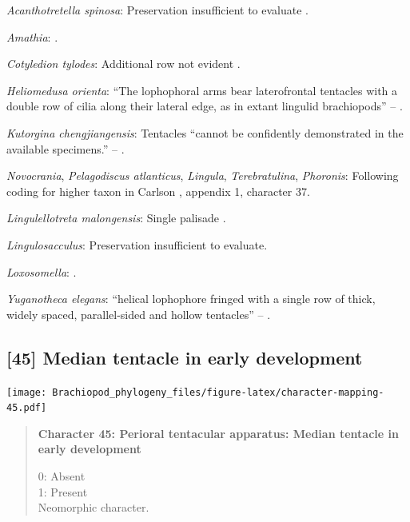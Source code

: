 \documentclass[openany]{book}
\begin{document}
\hypertarget{Acanthotretella_spinosa-coding-44}{}
\emph{Acanthotretella spinosa}: Preservation insufficient to evaluate
\citep{Holmer2006Aspinose}.

\hypertarget{Amathia-coding-44}{}
\emph{Amathia}: \citep{Temereva2016Thenervous}.

\hypertarget{Cotyledion_tylodes-coding-44}{}
\emph{Cotyledion tylodes}: Additional row not evident \citep{Zhang2013}.

\hypertarget{Heliomedusa_orienta-coding-44}{}
\emph{Heliomedusa orienta}: ``The lophophoral arms bear laterofrontal
tentacles with a double row of cilia along their lateral edge, as in
extant lingulid brachiopods'' -- \citet{Zhang2009Architectureand}.

\hypertarget{Kutorgina_chengjiangensis-coding-44}{}
\emph{Kutorgina chengjiangensis}: Tentacles ``cannot be confidently
demonstrated in the available specimens.'' --
\citet{Zhang2007Rhynchonelliformeanbrachiopods}.

\hypertarget{Lingula-coding-44}{}
\emph{Novocrania}, \emph{Pelagodiscus atlanticus}, \emph{Lingula},
\emph{Terebratulina}, \emph{Phoronis}: Following coding for higher taxon
in Carlson \citeyearpar{Carlson1995Phylogeneticrelationships}, appendix
1, character 37.

\hypertarget{Lingulellotreta_malongensis-coding-44}{}
\emph{Lingulellotreta malongensis}: Single palisade
\citep{Zhang2004Newdata}.

\hypertarget{Lingulosacculus-coding-44}{}
\emph{Lingulosacculus}: Preservation insufficient to evaluate.

\hypertarget{Loxosomella-coding-44}{}
\emph{Loxosomella}: \citet{Nielsen1966}.

\hypertarget{Yuganotheca_elegans-coding-44}{}
\emph{Yuganotheca elegans}: ``helical lophophore fringed with a single
row of thick, widely spaced, parallel-sided and hollow tentacles'' --
\citet{Zhang2014Anearly}.

\subsection*{{[}45{]} Median tentacle in early
development}\label{median-tentacle-in-early-development}

\texttt{[image: Brachiopod\_phylogeny\_files/figure-latex/character-mapping-45.pdf]}

\begin{quote}
\textbf{Character 45: Perioral tentacular apparatus: Median tentacle in
early development}

0: Absent\\
1: Present\\
Neomorphic character.
\end{quote}
\end{document}
